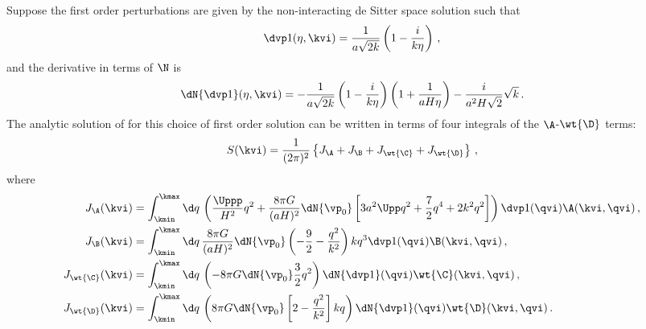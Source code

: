 Suppose the first order perturbations are given by the non-interacting de Sitter space solution
such that
% 
 \begin{equation}
 \dvp1(\eta, \kvi) = \frac{1}{a\sqrt{2 k}} \left( 1 - \frac{i}{k \eta}\right) \,,
\end{equation}
% 
and the derivative in terms of $\N$ is 
% 
\begin{equation}
 \dN{\dvp1}(\eta, \kvi) = -  \frac{1}{a\sqrt{2 k}} \left( 1 -
                        \frac{i}{k \eta}\right) \left(1 + \frac{1}{aH\eta}\right)
                         - \frac{i}{a^2 H \sqrt{2}}\sqrt{k}\,.
\end{equation}
% 
The analytic solution of  for this choice of first order
solution can be written in terms of four integrals of the $\A$-$\wt{\D}$ terms:
% 
\begin{equation}
\label{eq:KG2-source-jterms-corr}
S(\kvi) = \frac{1}{(2\pi)^2} \left\{J_\A + J_\B + J_{\wt{\C}} + J_{\wt{\D}} \right\}\,,
\end{equation}
% 
where
\begin{align}
\label{eq:Jdefns-corr}
 J_\A(\kvi) &= \int_{\kmin}^{\kmax} \d q\, \left( 
                \frac{\Uppp}{H^2} q^2 + \frac{8\pi G}{(aH)^2}\dN{\vp_{0}}\left[ 
 3a^2\Upp q^2  + \frac{7}{2}q^4 + 2k^2q^2 \right] \right) \dvp1(\qvi) \A(\kvi, \qvi) \,, \\
% 
 J_\B(\kvi) &= \int_{\kmin}^{\kmax} \d q\, \frac{8\pi G}{(aH)^2}\dN{\vp_{0}}\left(-\frac{9}{2} -
\frac{q^2}{k^2}\right)kq^3 \dvp1(\qvi) \B(\kvi, \qvi) \,, \\
%  
J_{\wt{\C}}(\kvi) &= \int_{\kmin}^{\kmax} \d q\, \left(
                        -8\pi G \dN{\vp_{0}} \frac{3}{2}q^2 \right) \dN{\dvp1}(\qvi)
\wt{\C}(\kvi, \qvi) \,, \\
%  
J_{\wt{\D}}(\kvi) &= \int_{\kmin}^{\kmax} \d q\, \left(
                       8\pi G \dN{\vp_{0}} \left[2-\frac{q^2}{k^2}\right] kq \right)
\dN{\dvp1}(\qvi) \wt{\D}(\kvi, \qvi) \,. 
\end{align}
% 

